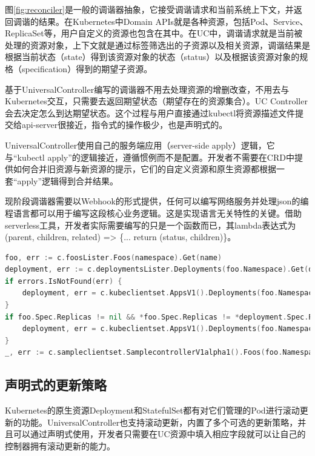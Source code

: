\documentclass[macfonts,master]{njuthesis}
\begin{document}
图\ref{fig:reconciler}是一般的调谐器抽象，它接受调谐请求和当前系统上下文，并返回调谐的结果。在Kubernetes中Domain APIs就是各种资源，包括Pod、Service、ReplicaSet等，用户自定义的资源也包含在其中。在UC中，调谐请求就是当前被处理的资源对象，上下文就是通过标签筛选出的子资源以及相关资源，调谐结果是根据当前状态（state）得到该资源对象的状态（status）以及根据该资源对象的规格（specification）得到的期望子资源。

基于UniversalController编写的调谐器不用去处理资源的增删改查，不用去与Kubernetes交互，只需要去返回期望状态（期望存在的资源集合）。UC Controller会去决定怎么到达期望状态。这个过程与用户直接通过kubectl将资源描述文件提交给api-server很接近，指令式的操作极少，也是声明式的。

UniversalController使用自己的服务端应用（server-side apply）逻辑，它与“kubectl apply”的逻辑接近，遵循惯例而不是配置。开发者不需要在CRD中提供如何合并旧资源与新资源的提示，它们的自定义资源和原生资源都根据一套“apply”逻辑得到合并结果。

现阶段调谐器需要以Webhook的形式提供，任何可以编写网络服务并处理json的编程语言都可以用于编写这段核心业务逻辑。这是实现语言无关特性的关键。借助serverless工具，开发者实际需要编写的只是一个函数而已，其lambda表达式为(parent, children, related) => \{... return (status, children)\}。

\newpage
\begin{lstlisting}[language=Go,caption=sample-controller中对资源进行增删改查的代码段,label=listing:crud-rc]
foo, err := c.foosLister.Foos(namespace).Get(name)
deployment, err := c.deploymentsLister.Deployments(foo.Namespace).Get(deploymentName)
if errors.IsNotFound(err) {
    deployment, err = c.kubeclientset.AppsV1().Deployments(foo.Namespace).Create(context.TODO(), newDeployment(foo), metav1.CreateOptions{})
}
if foo.Spec.Replicas != nil && *foo.Spec.Replicas != *deployment.Spec.Replicas {
    deployment, err = c.kubeclientset.AppsV1().Deployments(foo.Namespace).Update(context.TODO(), newDeployment(foo), metav1.UpdateOptions{})
}
_, err := c.sampleclientset.SamplecontrollerV1alpha1().Foos(foo.Namespace).Update(context.TODO(), fooCopy, metav1.UpdateOptions{})
\end{lstlisting}

\subsection{声明式的更新策略}
Kubernetes的原生资源Deployment和StatefulSet都有对它们管理的Pod进行滚动更新的功能。UniversalController也支持滚动更新，内置了多个可选的更新策略，并且可以通过声明式使用，开发者只需要在UC资源中填入相应字段就可以让自己的控制器拥有滚动更新的能力。
\end{document}
